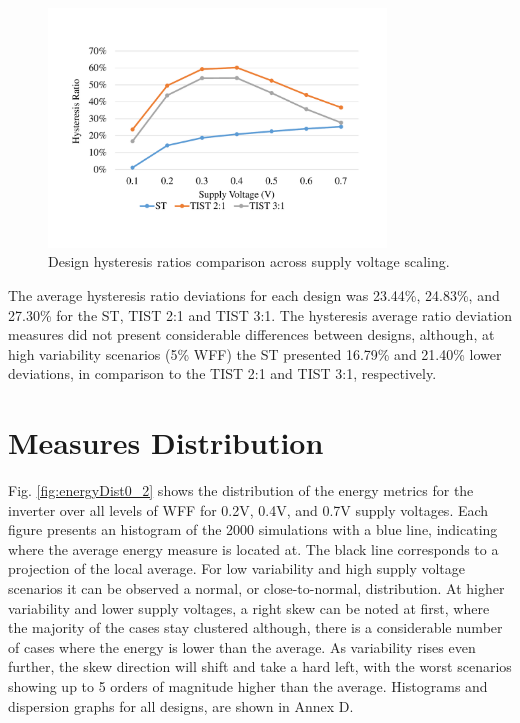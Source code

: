\documentclass[pgmicro,diss,english]{iiufrgs}
\begin{document}
    \begin{figure}[H]
        \centering
            \includegraphics[width=0.8\textwidth, trim={2cm 3cm 2cm 3cm}, clip]{hystRatiosVdd.pdf}
            \caption{Design hysteresis ratios comparison across supply voltage scaling.}
        \label{fig:hystRatiosVdd}
    \end{figure}

    The average hysteresis ratio deviations for each design was 23.44\%, 24.83\%, and 27.30\% for the ST, TIST 2:1 and TIST 3:1. The hysteresis average ratio deviation measures did not present considerable differences between designs, although, at high variability scenarios (5\% WFF) the ST presented 16.79\% and 21.40\% lower deviations, in comparison to the TIST 2:1 and TIST 3:1, respectively.

\newpage
\section{Measures Distribution}

    Fig. \ref{fig:energyDist0_2} shows the distribution of the energy metrics for the inverter over all levels of WFF for 0.2V, 0.4V, and 0.7V supply voltages. Each figure presents an histogram of the 2000 simulations with a blue line, indicating where the average energy measure is located at. The black line corresponds to a projection of the local average. For low variability and high supply voltage scenarios it can be observed a normal, or close-to-normal, distribution. At higher variability and lower supply voltages, a right skew can be noted at first, where the majority of the cases stay clustered although, there is a considerable number of cases where the energy is lower than the average. As variability rises even further, the skew direction will shift and take a hard left, with the worst scenarios showing up to 5 orders of magnitude higher than the average. Histograms and dispersion graphs for all designs, are shown in Annex D.
\end{document}
